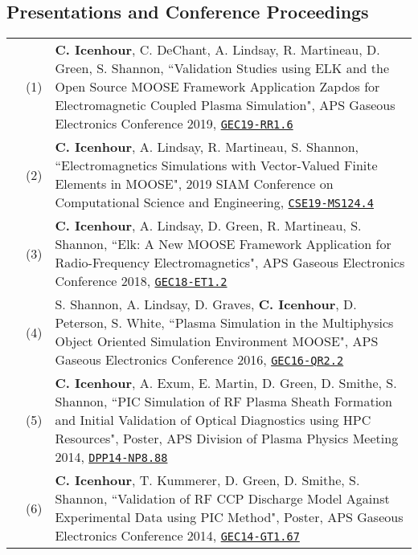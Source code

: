 \documentclass{article}
\begin{document}
\subsection*{Presentations and Conference Proceedings}

	\begin{tabularx}{\textwidth}{l l X}
		\hspace{2em}
			& (1)  & \textbf{C. Icenhour}, C. DeChant, A. Lindsay, R. Martineau, D. Green, S. Shannon, ``Validation Studies using ELK and the Open Source MOOSE Framework Application Zapdos for Electromagnetic Coupled Plasma Simulation", APS Gaseous Electronics Conference 2019, \href{http://meetings.aps.org/Meeting/GEC19/Session/RR1.6}{\texttt{GEC19-RR1.6}} \\
			& (2)  & \textbf{C. Icenhour}, A. Lindsay, R. Martineau, S. Shannon, ``Electromagnetics Simulations with Vector-Valued Finite Elements in MOOSE", 2019 SIAM Conference on Computational Science and Engineering, \href{http://meetings.siam.org/sess/dsp_talk.cfm?p=96892}{\texttt{CSE19-MS124.4}} \\
			& (3)  & \textbf{C. Icenhour}, A. Lindsay, D. Green, R. Martineau, S. Shannon, ``Elk: A New MOOSE Framework Application for Radio-Frequency Electromagnetics", APS Gaseous Electronics Conference 2018, \href{http://meetings.aps.org/link/BAPS.2018.GEC.ET1.2}{\texttt{GEC18-ET1.2}} \\
			& (4)  &  S. Shannon, A. Lindsay, D. Graves, \textbf{C. Icenhour}, D. Peterson, S. White, ``Plasma Simulation in the Multiphysics Object Oriented Simulation Environment MOOSE", APS Gaseous Electronics Conference 2016, \href{http://meetings.aps.org/link/BAPS.2016.GEC.QR2.2}{\texttt{GEC16-QR2.2}} \\
			& (5)  & \textbf{C. Icenhour}, A. Exum, E. Martin, D. Green, D. Smithe, S. Shannon, ``PIC Simulation of RF Plasma Sheath Formation and Initial Validation of Optical Diagnostics using HPC Resources", Poster, APS Division of Plasma Physics Meeting 2014, \href{http://meetings.aps.org/link/BAPS.2014.DPP.NP8.88}{\texttt{DPP14-NP8.88}} \\
			& (6)  & \textbf{C. Icenhour}, T. Kummerer, D. Green, D. Smithe, S. Shannon, ``Validation of RF CCP Discharge Model Against Experimental Data using PIC Method", Poster, APS Gaseous Electronics Conference 2014, \href{http://meetings.aps.org/link/BAPS.2014.GEC.GT1.67}{\texttt{GEC14-GT1.67}}
	\end{tabularx}
\end{document}
